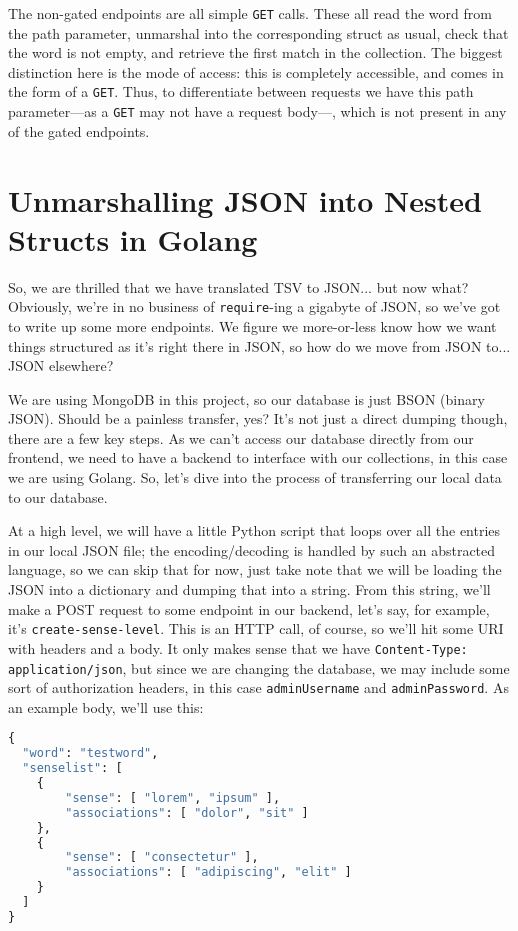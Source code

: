 \documentclass[11pt, twoside, reqno]{book}
\begin{document}
The non-gated endpoints are all simple \texttt{GET} calls. These all read the word from the path parameter, unmarshal into the corresponding struct as usual, check that the word is not empty, and retrieve the first match in the collection. The biggest distinction here is the mode of access: this is completely accessible, and comes in the form of a \texttt{GET}. Thus, to differentiate between requests we have this path parameter—as a \texttt{GET} may not have a request body—, which is not present in any of the gated endpoints.

\section{Unmarshalling JSON into Nested Structs in Golang}

So, we are thrilled that we have translated TSV to JSON... but now what? Obviously, we're in no business of \texttt{require}-ing a gigabyte of JSON, so we've got to write up some more endpoints. We figure we more-or-less know how we want things structured as it's right there in JSON, so how do we move from JSON to... \textit{}JSON elsewhere\textit{}?

We are using MongoDB in this project, so our database is just BSON (binary JSON). Should be a painless transfer, yes? It's not just a direct dumping though, there are a few key steps. As we can't access our database directly from our frontend, we need to have a backend to interface with our collections, in this case we are using Golang. So, let's dive into the process of transferring our local data to our database.

At a high level, we will have a little Python script that loops over all the entries in our local JSON file; the encoding/decoding is handled by such an abstracted language, so we can skip that for now, just take note that we will be loading the JSON into a dictionary and dumping that into a string. From this string, we'll make a POST request to some endpoint in our backend, let's say, for example, it's  \texttt{create-sense-level}. This is an HTTP call, of course, so we'll hit some URI with headers and a body. It only makes sense that we have \texttt{Content-Type: application/json}, but since we are changing the database, we may include some sort of authorization headers, in this case \texttt{adminUsername} and \texttt{adminPassword}. As an example body, we'll use this:
\begin{lstlisting}[language=Python]
{
  "word": "testword",
  "senselist": [
  	{
  		"sense": [ "lorem", "ipsum" ],
  		"associations": [ "dolor", "sit" ]
  	},
  	{
  		"sense": [ "consectetur" ],
  		"associations": [ "adipiscing", "elit" ]
  	}
  ]
}
\end{lstlisting}
\end{document}
